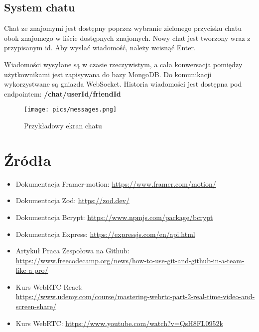\documentclass{article}
\begin{document}
\subsection{System chatu}

Chat ze znajomymi jest dostępny poprzez wybranie zielonego przycisku chatu obok znajomego w liście dostępnych znajomych. Nowy chat jest tworzony wraz z przypisanym id. Aby wysłać wiadomość, należy wcisnąć Enter.

Wiadomości wysyłane są w czasie rzeczywistym, a cała konwersacja pomiędzy użytkownikami jest zapisywana do bazy MongoDB. Do komunikacji wykorzystwane są gniazda WebSocket. Historia wiadomości jest dostępna pod endpointem: \textbf{/chat/userId/friendId}

\begin{figure}[h]
    \centering
    \texttt{[image: pics/messages.png]}
    \caption*{Przykładowy ekran chatu}
\end{figure}


\section{Źródła}
\begin{itemize}
    \item Dokumentacja Framer-motion: \url{https://www.framer.com/motion/}
    \item Dokumentacja Zod: \url{https://zod.dev/}
    \item Dokumentacja Bcrypt: \url{https://www.npmjs.com/package/bcrypt}
    \item Dokumentacja Express: \url{https://expressjs.com/en/api.html}
    \item Artykuł Praca Zespołowa na Github: \\
    \url{https://www.freecodecamp.org/news/how-to-use-git-and-github-in-a-team-like-a-pro/}
    \item Kurs WebRTC React: \\
    \url{https://www.udemy.com/course/mastering-webrtc-part-2-real-time-video-and-screen-share/}
    \item Kurs WebRTC: \url{https://www.youtube.com/watch?v=QsH8FL0952k}
\end{itemize}
\end{document}
